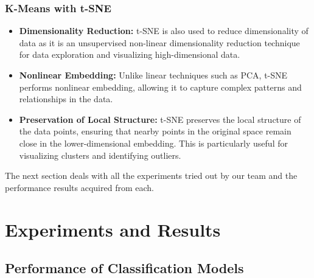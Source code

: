 \documentclass[a4paper]{article}
\theoremstyle{plain}
\theoremstyle{definition}
\begin{document}
{\subsubsection{K-Means with t-SNE}
\begin{itemize}
\item[] \textbf{Dimensionality Reduction:} t-SNE is also used to reduce dimensionality of data as it is an unsupervised non-linear dimensionality reduction technique for data exploration and visualizing high-dimensional data.
  
    \item[] \textbf{Nonlinear Embedding:} Unlike linear techniques such as PCA, t-SNE performs nonlinear embedding, allowing it to capture complex patterns and relationships in the data.
    
    \item[] \textbf{Preservation of Local Structure:} t-SNE preserves the local structure of the data points, ensuring that nearby points in the original space remain close in the lower-dimensional embedding. This is particularly useful for visualizing clusters and identifying outliers.

\end{itemize}



\noindent The next section deals with all the experiments tried out by our team and the performance results acquired from each.
\newpage


	
	\section{Experiments and Results}
	\label{sec:app}
	
\subsection {Performance of Classification Models}
}
\end{document}

